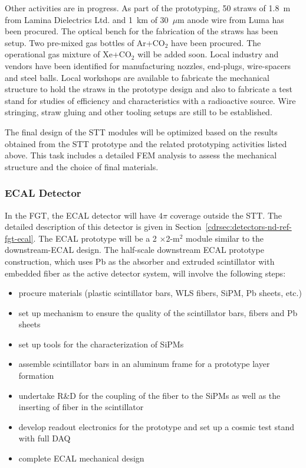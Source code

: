 Other activities are in progress. As part of the prototyping, 50 straws of 1.8~m from Lamina
Dielectrics Ltd. and 1~km of 30~$\mu$m anode wire from Luma
has been procured. The optical bench for the fabrication of the
straws has been setup.  Two pre-mixed gas bottles of Ar+CO$_2$ have been
procured. The operational gas mixture of
Xe+CO$_2$ will be added
soon. Local industry and vendors have been identified for
manufacturing nozzles, end-plugs, wire-spacers and steel
balls. Local workshops are available to fabricate the mechanical
structure to hold the straws in the prototype design and also to
fabricate a test stand for studies of efficiency and characteristics with
a radioactive source. Wire stringing, straw gluing and other tooling
setups are still to be established.


The final design of the STT modules will be optimized based on the
results obtained from the STT prototype and the related prototyping
activities listed above. This task includes a detailed FEM analysis to
assess the mechanical structure and the choice of final
materials. 



\subsubsection{ECAL Detector}

In the FGT, the ECAL detector will have $4\pi$ coverage outside
the STT.  The detailed description of this
detector is given in Section~\ref{cdrsec:detectors-nd-ref-fgt-ecal}.
The ECAL prototype will be a 2 $\times$2-m$^2$ module similar to the
downstream-ECAL design.  The half-scale downstream ECAL prototype
construction, which uses Pb as the absorber and extruded scintillator
with embedded fiber as the active detector system, will involve the
following steps:
\begin{itemize}
\item procure materials (plastic scintillator bars, WLS fibers,
  SiPM, Pb sheets, etc.)
\item set up mechanism to ensure the quality of the scintillator bars,
  fibers and Pb sheets
\item set up tools for the characterization of SiPMs
\item assemble scintillator bars in an aluminum frame for a
  prototype layer formation
\item undertake R\&D for the coupling of the fiber to the SiPMs as well
  as the inserting of fiber in the scintillator
\item develop readout electronics for the prototype and set up a cosmic
  test stand with full DAQ
\item complete ECAL mechanical design 
\end{itemize}

